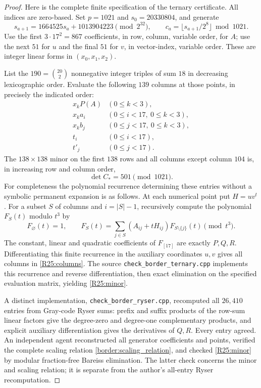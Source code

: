 \begin{proof}
Here is the complete finite specification of the ternary
certificate. All indices are zero-based. Set $p=1021$ and
$s_0=20330804$, and generate
\[
 s_{a+1}=1664525s_a+1013904223\pmod{2^{32}},
 \qquad c_a=\lfloor s_{a+1}/2^8\rfloor\bmod1021.
\]
Use the first $3\cdot17^2=867$ coefficients, in row, column,
variable order, for $A$; use the next $51$ for $u$ and the final
$51$ for $v$, in vector-index, variable order. These are integer
linear forms in $(x_0,x_1,x_2)$.

List the $190=\binom{20}{2}$ nonnegative integer triples of sum
$18$ in decreasing lexicographic order. Evaluate the following
$139$ columns at those points, in precisely the indicated order:
\begin{equation}\label{R25:columns}
 \begin{array}{ll}
  x_kP(A) &(0\leq k<3),\\
  x_ka_i &(0\leq i<17,\ 0\leq k<3),\\
  x_kb_j &(0\leq j<17,\ 0\leq k<3),\\
  t_i &(0\leq i<17),\\
  t'_j &(0\leq j<17).
 \end{array}
\end{equation}
The $138\times138$ minor on the first $138$ rows and all columns
except column $104$ is, in increasing row and column order,
\begin{equation}\label{R25:minor}
 \det C_*=501\pmod{1021}.
\end{equation}
For completeness the polynomial recurrence determining these
entries without a symbolic permanent expansion is as follows.
At each numerical point put $H=uv^t$. For a subset $S$ of
columns and $i=|S|-1$, recursively compute the polynomial
$F_S(t)$ modulo $t^3$ by
\[
 F_\varnothing(t)=1,\qquad
 F_S(t)=\sum_{j\in S}(A_{ij}+tH_{ij})F_{S\setminus\{j\}}(t)
                         \pmod{t^3}.
\]
The constant, linear and quadratic coefficients of $F_{[17]}$
are exactly $P,Q,R$. Differentiating this finite recurrence in
the auxiliary coordinates $u,v$ gives all columns in
\eqref{R25:columns}. The source
\texttt{check\_border\_ternary.cpp} implements this recurrence
and reverse differentiation, then exact elimination on the
specified evaluation matrix, yielding \eqref{R25:minor}.

A distinct implementation, \texttt{check\_border\_ryser.cpp},
recomputed all $26{,}410$ entries from Gray-code Ryser sums:
prefix and suffix products of the row-sum linear factors give
the degree-zero and degree-one complementary products, and
explicit auxiliary differentiation gives the derivatives of
$Q,R$. Every entry agreed. An independent agent reconstructed
all generator coefficients and points, verified the complete
scaling relation \eqref{border:scaling_relation}, and checked
\eqref{R25:minor} by modular fraction-free Bareiss elimination.
The latter check concerns the minor and scaling relation; it
is separate from the author's all-entry Ryser recomputation.


\end{proof}
